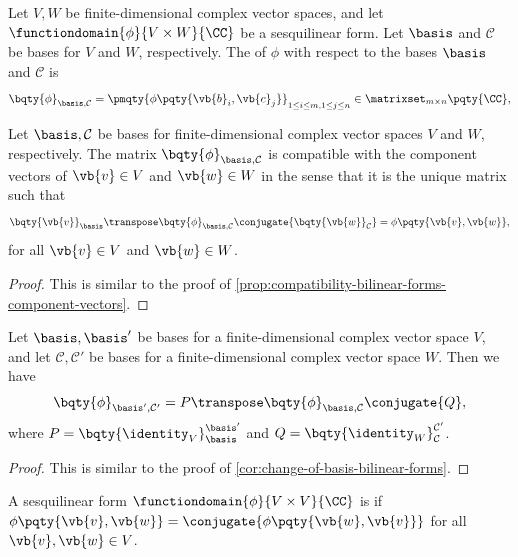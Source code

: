 \begin{definition}
    Let \(V, W\) be finite-dimensional complex vector spaces, and let \(\functiondomain{\phi}{V \times W}{\CC}\) be a sesquilinear form. Let \(\basis\) and \(\mathcal{C}\) be bases for \(V\) and \(W\), respectively. The  of \(\phi\) with respect to the bases \(\basis\) and \(\mathcal{C}\) is
    \[
        \bqty{\phi}_{\basis, \mathcal{C}} = \pmqty{\phi\pqty{\vb{b}_i, \vb{c}_j}}_{1 \leq i \leq m, 1 \leq j \leq n} \in \matrixset_{m \times n} \pqty{\CC},
    \]
\end{definition}

\begin{proposition}
    Let \(\basis, \mathcal{C}\) be bases for finite-dimensional complex vector spaces \(V\) and \(W\), respectively. The matrix \(\bqty{\phi}_{\basis, \mathcal{C}}\) is compatible with the component vectors of \(\vb{v} \in V\) and \(\vb{w} \in W\) in the sense that it is the unique matrix such that
    \[
        \bqty{\vb{v}}_{\basis}\transpose \bqty{\phi}_{\basis, \mathcal{C}} \conjugate{\bqty{\vb{w}}_{\mathcal{C}}} = \phi\pqty{\vb{v}, \vb{w}},
    \]
    for all \(\vb{v} \in V\) and \(\vb{w} \in W\).
\end{proposition}

\begin{proof}
    This is similar to the proof of \autoref{prop:compatibility-bilinear-forms-component-vectors}.
\end{proof}

\begin{corollary}
    Let \(\basis, \basis'\) be bases for a finite-dimensional complex vector space \(V\), and let \(\mathcal{C}, \mathcal{C}'\) be bases for a finite-dimensional complex vector space \(W\). Then we have
    \[
        \bqty{\phi}_{\basis', \mathcal{C}'} = P\transpose \bqty{\phi}_{\basis, \mathcal{C}} \conjugate{Q},
    \]
    where \(P = \bqty{\identity_V}_{\basis}^{\basis'}\) and \(Q = \bqty{\identity_W}_{\mathcal{C}}^{\mathcal{C}'}\).
\end{corollary}

\begin{proof}
    This is similar to the proof of \autoref{cor:change-of-basis-bilinear-forms}.
\end{proof}

\begin{definition}
    A sesquilinear form \(\functiondomain{\phi}{V \times V}{\CC}\) is  if \(\phi\pqty{\vb{v}, \vb{w}} = \conjugate{\phi\pqty{\vb{w}, \vb{v}}}\) for all \(\vb{v}, \vb{w} \in V\).
\end{definition}

